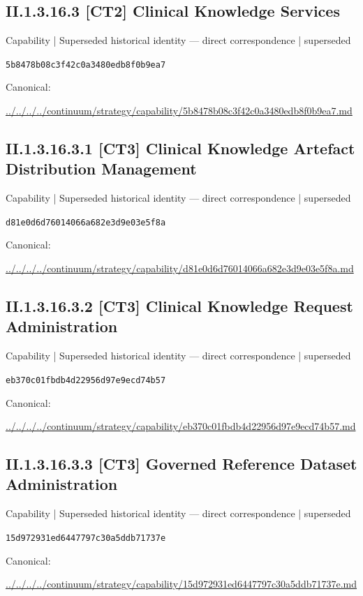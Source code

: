 \documentclass[10pt,a4paper]{article}
\begin{document}
\subsection*{II.1.3.16.3 [CT2] Clinical Knowledge Services}
{\small Capability | Superseded historical identity — direct correspondence | superseded}\par
\texttt{5b8478b08c3f42c0a3480edb8f0b9ea7}\par
Canonical: \par
{\footnotesize\url{../../../../continuum/strategy/capability/5b8478b08c3f42c0a3480edb8f0b9ea7.md}}\par
\subsection*{II.1.3.16.3.1 [CT3] Clinical Knowledge Artefact Distribution Management}
{\small Capability | Superseded historical identity — direct correspondence | superseded}\par
\texttt{d81e0d6d76014066a682e3d9e03e5f8a}\par
Canonical: \par
{\footnotesize\url{../../../../continuum/strategy/capability/d81e0d6d76014066a682e3d9e03e5f8a.md}}\par
\subsection*{II.1.3.16.3.2 [CT3] Clinical Knowledge Request Administration}
{\small Capability | Superseded historical identity — direct correspondence | superseded}\par
\texttt{eb370c01fbdb4d22956d97e9ecd74b57}\par
Canonical: \par
{\footnotesize\url{../../../../continuum/strategy/capability/eb370c01fbdb4d22956d97e9ecd74b57.md}}\par
\subsection*{II.1.3.16.3.3 [CT3] Governed Reference Dataset Administration}
{\small Capability | Superseded historical identity — direct correspondence | superseded}\par
\texttt{15d972931ed6447797c30a5ddb71737e}\par
Canonical: \par
{\footnotesize\url{../../../../continuum/strategy/capability/15d972931ed6447797c30a5ddb71737e.md}}\par
\end{document}
